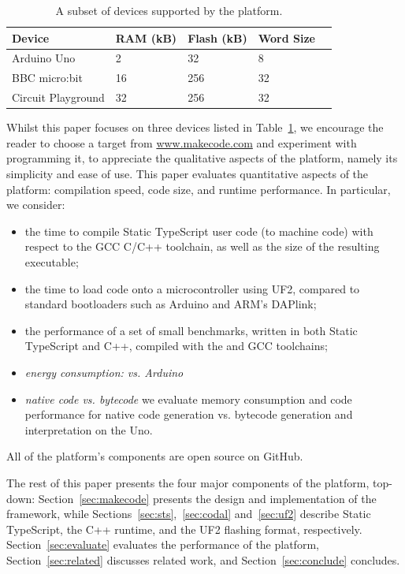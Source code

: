 \begin{table}[]
\centering
\begin{tabular}{|l|l|l|l|l|}
\hline
Device             & RAM (kB) & Flash (kB) & Word Size        \\ \hline
Arduino Uno        & 2        & 32         & 8               \\ \hline
BBC micro:bit      & 16       & 256        & 32              \\ \hline
Circuit Playground & 32       & 256        & 32              \\ \hline
\end{tabular}
\caption{\label{table:devices}A subset of devices supported by the platform.}
\end{table}
Whilst this paper focuses on three devices listed in Table~\ref{table:devices}, we encourage the reader to choose a target
from \url{www.makecode.com} and experiment with programming it, to appreciate the
qualitative aspects of the platform, namely its simplicity and ease of use.
This paper evaluates quantitative aspects of the platform:
compilation speed, code size, and runtime performance.  In particular, we
consider:
\begin{itemize}
\item the time to compile Static TypeScript user code (to machine code) with respect
      to the GCC C/C++ toolchain, as well as the size of the resulting executable;
\item the time to load code onto a microcontroller using UF2, compared to standard bootloaders
      such as Arduino and ARM's DAPlink;
\item the performance of a set of small benchmarks, written in both Static TypeScript and C++,
      compiled with the \MC and GCC toolchains;
\item \emph{energy consumption: \CO vs. Arduino}
\item \emph{native code vs. bytecode} we
      evaluate memory consumption and code performance for native code generation
      vs. bytecode generation and interpretation on the Uno.
\end{itemize}


All of the platform's components are open source on GitHub.
  
The rest of this paper presents the four major components of the platform,
top-down: Section~\ref{sec:makecode} presents the design
and implementation of the \MC framework, while
Sections~\ref{sec:sts},~\ref{sec:codal} and~\ref{sec:uf2} describe Static TypeScript,
the \CO C++ runtime, and the UF2 flashing format, respectively.
Section~\ref{sec:evaluate} evaluates the performance of the platform,
Section~\ref{sec:related} discusses related work, and Section~\ref{sec:conclude}
concludes.
